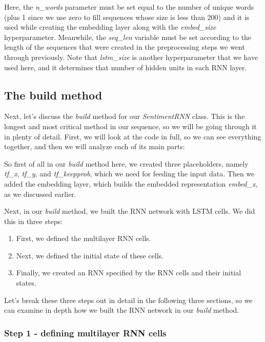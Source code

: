 \documentclass[11pt]{article}
\providecommand{\tightlist}{%
      \setlength{\itemsep}{0pt}\setlength{\parskip}{0pt}}
\begin{document}
    Here, the \emph{n\_words} parameter must be set equal to the number of
unique words (plus 1 since we use zero to fill sequences whose size is
less than 200) and it is used while creating the embedding layer along
with the \emph{embed\_size} hyperparameter. Meanwhile, the
\emph{seq\_len} variable must be set according to the length of the
sequences that were created in the preprocessing steps we went through
previously. Note that \emph{lstm\_size} is another hyperparameter that
we have used here, and it determines that number of hidden units in each
RNN layer.

    \subsection{The build method}\label{the-build-method}

    Next, let's discuss the \emph{build} method for our \emph{SentimentRNN}
class. This is the longest and most critical method in our sequence, so
we will be going through it in plenty of detail. First, we will look at
the code in full, so we can see everything together, and then we will
analyze each of its main parts:

So first of all in our \emph{build} method here, we created three
placeholders, namely \emph{tf\_x}, \emph{tf\_y}, and
\emph{tf\_keepprob}, which we need for feeding the input data. Then we
added the embedding layer, which builds the embedded representation
\emph{embed\_x}, as we discussed earlier.

Next, in our \emph{build} method, we built the RNN network with LSTM
cells. We did this in three steps:

\begin{enumerate}
\def\labelenumi{\arabic{enumi}.}
\tightlist
\item
  First, we defined the multilayer RNN cells.
\item
  Next, we defined the initial state of these cells.
\item
  Finally, we created an RNN specified by the RNN cells and their
  initial states.
\end{enumerate}

Let's break these three steps out in detail in the following three
sections, so we can examine in depth how we built the RNN network in our
\emph{build} method.

    \subsubsection{Step 1 - defining multilayer RNN
cells}\label{step-1---defining-multilayer-rnn-cells}
\end{document}
